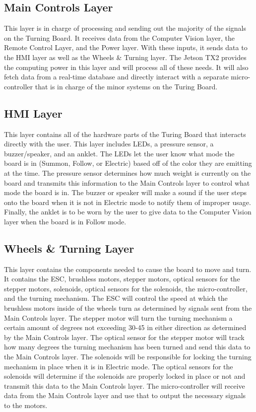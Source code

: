 \subsection{Main Controls Layer}
This layer is in charge of processing and sending out the majority of the signals on the Turning Board. It receives data from the Computer Vision layer, the Remote Control Layer, and the Power layer. With these inputs, it sends data to the HMI layer as well as the Wheels \& Turning layer. The Jetson TX2 provides the computing power in this layer and will process all of these needs. It will also fetch data from a real-time database and directly interact with a separate micro-controller that is in charge of the minor systems on the Turing Board.

\subsection{HMI Layer}
This layer contains all of the hardware parts of the Turing Board that interacts directly with the user. This layer includes LEDs, a pressure sensor, a buzzer/speaker, and an anklet. The LEDs let the user know what mode the board is in (Summon, Follow, or Electric) based off of the color they are emitting at the time. The pressure sensor determines how much weight is currently on the board and transmits this information to the Main Controls layer to control what mode the board is in. The buzzer or speaker will make a sound if the user steps onto the board when it is not in Electric mode to notify them of improper usage. Finally, the anklet is to be worn by the user to give data to the Computer Vision layer when the board is in Follow mode.

\subsection{Wheels \& Turning Layer}
This layer contains the components needed to cause the board to move and turn. It contains the ESC, brushless motors, stepper motors, optical sensors for the stepper motors, solenoids, optical sensors for the solenoids, the micro-controller, and the turning mechanism. The ESC will control the speed at which the brushless motors inside of the wheels turn as determined by signals sent from the Main Controls layer. The stepper motor will turn the turning mechanism a certain amount of degrees not exceeding 30-45 in either direction as determined by the Main Controls layer. The optical sensor for the stepper motor will track how many degrees the turning mechanism has been turned and send this data to the Main Controls layer. The solenoids will be responsible for locking the turning mechanism in place when it is in Electric mode. The optical sensors for the solenoids will determine if the solenoids are properly locked in place or not and transmit this data to the Main Controls layer. The micro-controller will receive data from the Main Controls layer and use that to output the necessary signals to the motors. 

